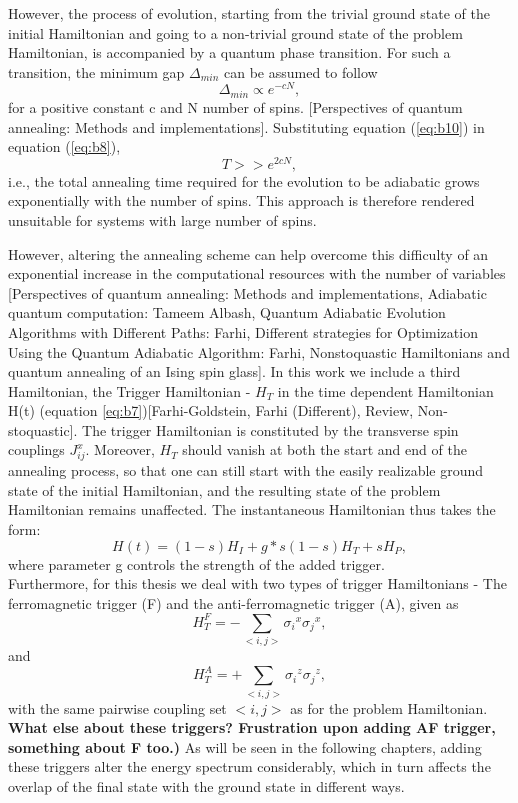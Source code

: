 \documentclass[12]{article}
\begin{document}
However, the process of evolution, starting from the trivial ground state of the initial Hamiltonian and going to a non-trivial ground state of the problem Hamiltonian, is accompanied by a quantum phase transition. For such a transition, the minimum gap $\Delta_{min}$ can be assumed to follow
\begin{equation}
\Delta_{min} \propto e^{-cN}, \label{eq:b10}
\end{equation}
for a positive constant c and N number of spins. [Perspectives of quantum annealing: Methods and implementations]. Substituting equation (\ref{eq:b10}) in equation (\ref{eq:b8}),
\begin{equation}
 T>> e^{2cN}, \label{eq:b11}
\end{equation}
i.e., the total annealing time required for the evolution to be adiabatic grows exponentially with the number of spins. This approach is therefore rendered unsuitable for systems with large number of spins.

However, altering the annealing scheme can help overcome this difficulty of an exponential increase in the computational resources with the number of variables [Perspectives of quantum annealing: Methods and implementations, Adiabatic quantum computation: Tameem Albash, Quantum Adiabatic Evolution Algorithms with Different Paths: Farhi, Different strategies for Optimization Using the Quantum Adiabatic Algorithm: Farhi, Nonstoquastic Hamiltonians and quantum annealing of an Ising spin glass]. In this work we include a third Hamiltonian, the Trigger Hamiltonian - $H_T$ in the time dependent Hamiltonian H(t) (equation \ref{eq:b7})[Farhi-Goldstein, Farhi (Different), Review, Non-stoquastic]. The trigger Hamiltonian is constituted by the transverse spin couplings $J_{ij}^x$. Moreover, $H_T$ should vanish at both the start and end of the annealing process, so that one can still start with the easily realizable ground state of the initial Hamiltonian, and the resulting state of the problem Hamiltonian remains unaffected. The instantaneous Hamiltonian thus takes the form: 
\begin{equation}
H(t)= (1-s)H_I + g*s(1-s)H_T + sH_P ,\label{eq:b12}
\end{equation} 
where parameter g controls the strength of the added trigger.\\
Furthermore, for this thesis we deal with two types of trigger Hamiltonians - The ferromagnetic trigger (F) and the anti-ferromagnetic trigger (A), given as
\begin{equation}
H_T^F = - \sum\limits_{<i,j>}{\sigma_i}^x{\sigma_j}^x,    \label{eq:b13}
\end{equation}
and
\begin{equation}
H_T^A= +\sum\limits_{<i,j>}{\sigma_i}^z{\sigma_j}^z,          \label{eq:b14}
\end{equation}
with the same pairwise coupling set $<i,j>$ as for the problem Hamiltonian.
\textbf{What else about these triggers? Frustration upon adding AF trigger, something about F too.)}
As will be seen in the following chapters, adding these triggers alter the energy spectrum considerably, which in turn affects the overlap of the final state with the ground state in different ways. \\
\end{document}
